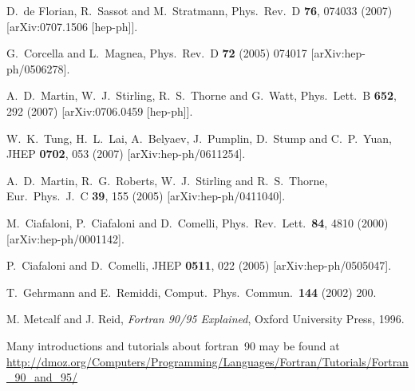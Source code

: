 \documentclass[12pt]{article}
\begin{document}
\begin{thebibliography}{99}
  D.~de Florian, R.~Sassot and M.~Stratmann,
  Phys.\ Rev.\  D {\bf 76}, 074033 (2007)
  [arXiv:0707.1506 [hep-ph]].


  G.~Corcella and L.~Magnea,
  Phys.\ Rev.\  D {\bf 72} (2005) 074017
  [arXiv:hep-ph/0506278].

  A.~D.~Martin, W.~J.~Stirling, R.~S.~Thorne and G.~Watt,
  Phys.\ Lett.\  B {\bf 652}, 292 (2007)
  [arXiv:0706.0459 [hep-ph]].

  W.~K.~Tung, H.~L.~Lai, A.~Belyaev, J.~Pumplin, D.~Stump and C.~P.~Yuan,
  JHEP {\bf 0702}, 053 (2007)
  [arXiv:hep-ph/0611254].

  A.~D.~Martin, R.~G.~Roberts, W.~J.~Stirling and R.~S.~Thorne,
  Eur.\ Phys.\ J.\  C {\bf 39}, 155 (2005)
  [arXiv:hep-ph/0411040].

  M.~Ciafaloni, P.~Ciafaloni and D.~Comelli,
  Phys.\ Rev.\ Lett.\  {\bf 84}, 4810 (2000)
  [arXiv:hep-ph/0001142].


  P.~Ciafaloni and D.~Comelli,
  JHEP {\bf 0511}, 022 (2005)
  [arXiv:hep-ph/0505047].


  T.~Gehrmann and E.~Remiddi,
  Comput.\ Phys.\ Commun.\  {\bf 144} (2002) 200.

  M. Metcalf and J. Reid, \emph{Fortran 90/95 Explained}, Oxford
  University Press, 1996.

 Many introductions and tutorials about
  fortran~90 may be found at
  \url{http://dmoz.org/Computers/Programming/Languages/Fortran/Tutorials/Fortran_90_and_95/}


\end{thebibliography}



\end{document}
